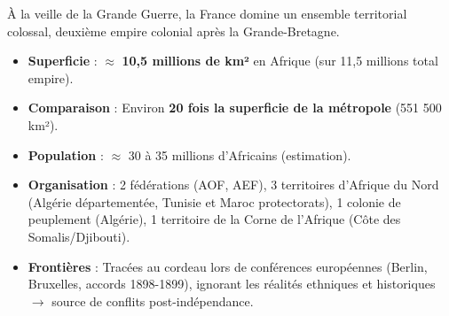 \documentclass[11pt]{article}
\begin{document}
À la veille de la Grande Guerre, la France domine un ensemble territorial colossal, deuxième empire colonial après la Grande-Bretagne.

\begin{aretenir}
\begin{itemize}
    \item \textbf{Superficie} : $\approx$ \textbf{10,5 millions de km²} en Afrique (sur 11,5 millions total empire).
    \item \textbf{Comparaison} : Environ \textbf{20 fois la superficie de la métropole} (551 500 km²).
    \item \textbf{Population} : $\approx$ 30 à 35 millions d'Africains (estimation).
    \item \textbf{Organisation} : 2 fédérations (AOF, AEF), 3 territoires d'Afrique du Nord (Algérie départementée, Tunisie et Maroc protectorats), 1 colonie de peuplement (Algérie), 1 territoire de la Corne de l'Afrique (Côte des Somalis/Djibouti).
    \item \textbf{Frontières} : Tracées au cordeau lors de conférences européennes (Berlin, Bruxelles, accords 1898-1899), ignorant les réalités ethniques et historiques $\rightarrow$ source de conflits post-indépendance.
\end{itemize}
\end{aretenir}
\end{document}
